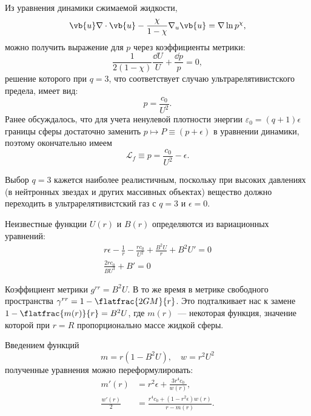 \documentclass[\docroot/reports/draft/report.tex]{subfiles}
\begin{document}
    Из уравнения динамики сжимаемой жидкости,
    \begin{equation*}
        \vb{u} \nabla \cdot \vb{u} - \frac{\chi}{1 - \chi} \nabla_u \vb{u} = \nabla \ln p^{\chi} ,
    \end{equation*}
    можно получить выражение для $p$ через коэффициенты метрики:
    \begin{equation*}
        \frac{1}{2 (1 - \chi)} \frac{\dd{U}}{U} + \frac{\dd{p}}{p} = 0 ,
    \end{equation*}
    решение которого при $q = 3$, что соответствует случаю ультрарелятивистского предела, имеет вид:
    \begin{equation*}
        p = \frac{c_0}{U^2} .
    \end{equation*}
    Ранее обсуждалось, что для учета ненулевой плотности энергии $\varepsilon_0 = (q+1) \epsilon$ границы сферы достаточно заменить $p \mapsto P \equiv (p + \epsilon)$ в уравнении динамики, поэтому окончательно имеем
    \begin{equation*}
        \mathcal{L}_f \equiv p = \frac{c_0}{U^2} - \epsilon .
    \end{equation*}

    Выбор $q = 3$ кажется наиболее реалистичным, поскольку при высоких давлениях (в нейтронных звездах и других массивных объектах) вещество должно переходить в ультрарелятивистский газ \cite{oppenheimer_volkoff,burlankov_new_phys} с $q = 3$ и $\epsilon = 0$.

    Неизвестные функции $U(r)$ и $B(r)$ определяются из вариационных уравнений:
    \begin{gather*}
        r \epsilon - \frac{1}{r} - \frac{r c_0}{U^2} + \frac{B^2 U}{r} + B^2 U' = 0 \\
        \frac{2 r c_0}{B U^3} + B' = 0
    \end{gather*}

    Коэффициент метрики $g^{rr} = B^2 U$. В то же время в метрике свободного пространства $\gamma^{rr} = 1 - \flatfrac{2 G M}{r}$. Это подталкивает нас к замене $1 - \flatfrac{m(r)}{r} = B^2 U$, где $m(r)$~--- некоторая функция, значение которой при $r = R$ пропорционально массе жидкой сферы.

    Введением функций
    \begin{equation*}
        m = r (1 - B^2 U) , \quad w = r^2 U^2
    \end{equation*}
    полученные уравнения можно переформулировать:
    \begin{align*}
        m'(r) &= r^2 \epsilon + \frac{3 r^4 c_0}{w(r)} , \\
        \frac{w'(r)}{2} &= \frac{r^4 c_0 + (1 - r^2 \epsilon) w(r)}{r - m(r)} .
    \end{align*}
\end{document}
